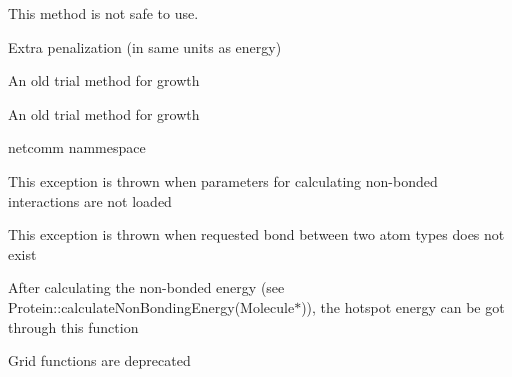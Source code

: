 \begin{DoxyRefList}
\label{deprecated__deprecated000044}%
%
This method is not safe to use.  
\item[Member \mbox{\hyperlink{classMolecule_abf3e45c79a7ae3fbb0fc174544debc1e}{Molecule\+::pE}} ]\label{deprecated__deprecated000042}%
%
Extra penalization (in same units as energy)  
\item[Member \mbox{\hyperlink{classMolecule_a28fd8a15cac9bf3f9df358af8ee07ff0}{Molecule\+::samplegrowimpartial}} (const \mbox{\hyperlink{classSystem}{System}} \&s, int n, int trials=15)]\label{deprecated__deprecated000046}%
%
An old trial method for growth  
\item[Member \mbox{\hyperlink{classMolecule_a6fb016cb3c6871904bd1e856e40f9fd1}{Molecule\+::samplegrowunrigid}} (const \mbox{\hyperlink{classSystem}{System}} \&s, int n, int trials=15)]\label{deprecated__deprecated000048}%
%
An old trial method for growth  
\item[Namespace \mbox{\hyperlink{namespacenetcomm}{netcomm}} ]\label{deprecated__deprecated000026}%
%
netcomm nammespace  
\item[Class \mbox{\hyperlink{classNonbondedInteractionsNotLoadedException}{Nonbonded\+Interactions\+Not\+Loaded\+Exception}} ]\label{deprecated__deprecated000028}%
%
This exception is thrown when parameters for calculating non-\/bonded interactions are not loaded  
\item[Class \mbox{\hyperlink{classNoSuchBondException}{No\+Such\+Bond\+Exception}} ]\label{deprecated__deprecated000030}%
%
This exception is thrown when requested bond between two atom types does not exist  
\item[Member \mbox{\hyperlink{classProtein_a284f503a736bda8f790d456d7c681e4b}{Protein\+::get\+Hotspot\+Binding\+Energy}} ()]\label{deprecated__deprecated000051}%
%
After calculating the non-\/bonded energy (see Protein\+::calculate\+Non\+Bonding\+Energy(\+Molecule$\ast$)), the hotspot energy can be got through this function  
\item[Member \mbox{\hyperlink{classSystem_ac2f56ead0bec07a4087ecdbbc35ca342}{System\+::generate\+Grid}} (int, int, int, double)]\label{deprecated__deprecated000038}%
%
Grid functions are deprecated  
\item[Member \mbox{\hyperlink{classSystem_a1f603feb6e6e6bec7e2d4e0296ec99e9}{System\+::get\+Closest\+Free\+Space}} (int x, int y, int z, int maxtries)]\label{deprecated__deprecated000040}%

\end{DoxyRefList}
